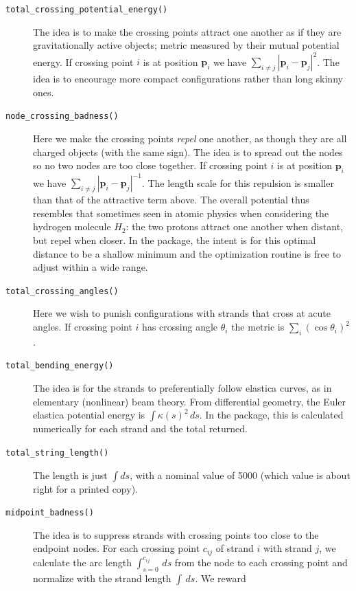 \documentclass{birkjour}
\theoremstyle{definition}
\theoremstyle{remark}
\numberwithin{equation}{section}
\begin{document}
\begin{description}
\item[{\tt total\_crossing\_potential\_energy()}] The idea is to make
  the crossing points attract one another as if they are
  gravitationally active objects; metric measured by their mutual
  potential energy.  If crossing point $i$ is at position ${\mathbf
    p}_i$ we have $\sum_{i\neq j}\left|{\mathbf p}_i-{\mathbf
    p}_j\right|^{2}$.  The idea is to encourage more compact
  configurations rather than long skinny ones.
\item[{\tt node\_crossing\_badness()}] Here we make the crossing
  points {\em repel} one another, as though they are all charged
  objects (with the same sign).  The idea is to spread out the nodes
  so no two nodes are too close together.  If crossing point $i$ is at
  position ${\mathbf p}_i$ we have $\sum_{i\neq j}\left|{\mathbf
    p}_i-{\mathbf p}_j\right|^{-1}$.  The length scale for this
  repulsion is smaller than that of the attractive term above.  The
  overall potential thus resembles that sometimes seen in atomic
  physics when considering the hydrogen molecule $H_2$: the two
  protons attract one another when distant, but repel when closer.  In
  the package, the intent is for this optimal distance to be a shallow
  minimum and the optimization routine is free to adjust within a wide
  range.
\item[{\tt total\_crossing\_angles()}] Here we wish to punish
  configurations with strands that cross at acute angles.  If crossing
  point $i$ has crossing angle $\theta_i$ the metric is
  $\sum_i\left(\cos\theta_i\right)^2$.
\item[{\tt total\_bending\_energy()}] The idea is for the strands to
  preferentially follow elastica curves, as in elementary (nonlinear)
  beam theory.  From differential geometry, the Euler elastica
  potential energy is $\int\kappa(s)^2\,ds$.  In the package, this is
  calculated numerically for each strand and the total returned.
\item[{\tt total\_string\_length()}] The length is just $\int ds$, with a
  nominal value of 5000 (which value is about right for a printed
  copy).
\item[{\tt midpoint\_badness()}] The idea is to suppress strands with
  crossing points too close to the endpoint nodes.  For each crossing
  point $c_{ij}$ of strand $i$ with strand $j$, we calculate the arc
  length $\int_{s=0}^{c_{ij}}\,ds$ from the node to each crossing
  point and normalize with the strand length $\int\,ds$.  We reward

\end{description}
\end{document}

